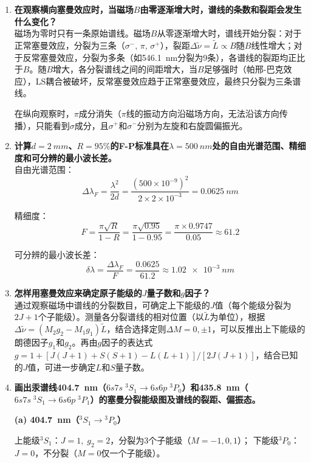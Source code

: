 \documentclass[a4paper,8pt,twocolumn]{article}
\begin{document}
\begin{enumerate}
  \item \textbf{在观察横向塞曼效应时，当磁场$B$由零逐渐增大时，谱线的条数和裂距会发生什么变化？}\\[0.3em]
  磁场为零时只有一条原始谱线。磁场$B$从零逐渐增大时，谱线开始分裂：对于正常塞曼效应，分裂为三条（$\sigma^-,\,\pi,\,\sigma^+$），裂距$\Delta\tilde{\nu} = \tilde{L} \propto B$随$B$线性增大；对于反常塞曼效应，分裂为多条（如\SI{546.1}{nm}分裂为9条），各谱线的裂距均正比于$B$。随$B$增大，各分裂谱线之间的间距增大，当$B$足够强时（帕邢-巴克效应），LS耦合被破坏，反常塞曼效应趋于正常塞曼效应，最终只分裂为三条谱线。

  在纵向观察时，$\pi$成分消失（$\pi$线的振动方向沿磁场方向，无法沿该方向传播），只能看到$\sigma$成分，且$\sigma^+$和$\sigma^-$分别为左旋和右旋圆偏振光。

  \item \textbf{计算$d = \SI{2}{mm}$、$R = 95\%$的F-P标准具在$\lambda = \SI{500}{nm}$处的自由光谱范围、精细度和可分辨的最小波长差。}\\[0.3em]
  自由光谱范围：
  \[
    \Delta\lambda_F = \frac{\lambda^2}{2d} = \frac{(500\times10^{-9})^2}{2\times2\times10^{-3}} = \SI{0.0625}{nm}
  \]

  精细度：
  \[
    F = \frac{\pi\sqrt{R}}{1-R} = \frac{\pi\sqrt{0.95}}{1-0.95} = \frac{\pi\times 0.9747}{0.05} \approx 61.2
  \]

  可分辨的最小波长差：
  \[
    \delta\lambda = \frac{\Delta\lambda_F}{F} = \frac{0.0625}{61.2} \approx \SI{1.02e-3}{nm}
  \]

  \item \textbf{怎样用塞曼效应来确定原子能级的$J$量子数和$g$因子？}\\[0.3em]
  通过观察磁场中谱线的分裂数目，可确定上下能级的$J$值（每个能级分裂为$2J+1$个子能级）。测量各分裂谱线的相对位置（以$\tilde{L}$为单位），根据$\Delta\tilde{\nu} = (M_2 g_2 - M_1 g_1)\tilde{L}$，结合选择定则$\Delta M = 0, \pm 1$，可以反推出上下能级的朗德因子$g_1$和$g_2$。再由$g$因子的表达式$g = 1 + [J(J+1)+S(S+1)-L(L+1)]/[2J(J+1)]$，结合已知的$J$值，可进一步确定$L$和$S$量子数。

  \item \textbf{画出汞谱线\SI{404.7}{nm}（$6s7s\;{}^3S_1 \to 6s6p\;{}^3P_0$）和\SI{435.8}{nm}（$6s7s\;{}^3S_1 \to 6s6p\;{}^3P_1$）的塞曼分裂能级图及谱线的裂距、偏振态。}

  \textbf{(a) \SI{404.7}{nm}（${}^3S_1 \to {}^3P_0$）}

  上能级${}^3S_1$：$J=1,\;g_2=2$，分裂为3个子能级（$M=-1,0,1$）；
  下能级${}^3P_0$：$J=0$，不分裂（$M=0$仅一个子能级）。


\end{enumerate}
\end{document}
